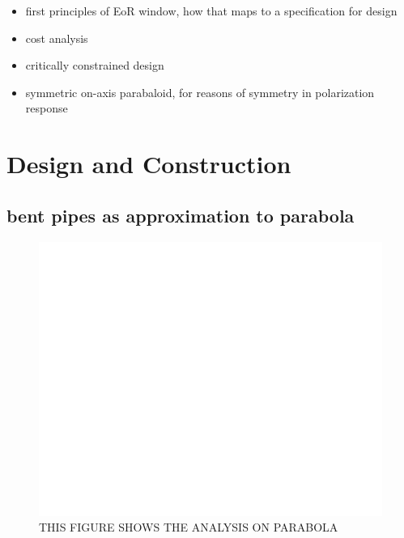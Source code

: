 \documentclass[preprint]{aastex}  %
\begin{document}
\begin{itemize}
\item first principles of EoR window, how that maps to a specification for design
\item cost analysis
\item critically constrained design
\item symmetric on-axis parabaloid, for reasons of symmetry in polarization response
\end{itemize}

\section{Design and Construction}
\label{sec:design}

\subsection{bent pipes as approximation to parabola}

\begin{figure}[H]
	\begin{center}
	\includegraphics[width =\textwidth]{empty}
	\caption{THIS FIGURE SHOWS THE ANALYSIS ON PARABOLA
\label{Fig:} }
	\end{center}
\end{figure}
\end{document}
